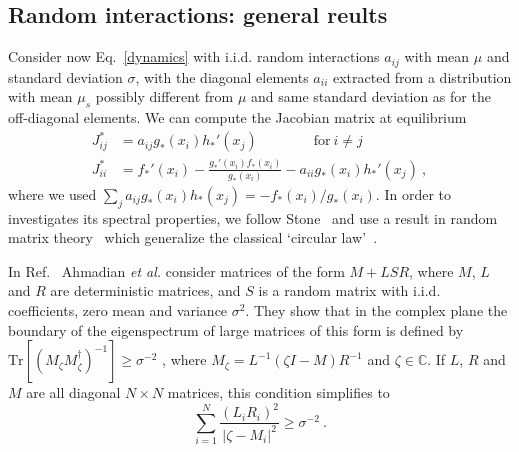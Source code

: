 \documentclass[
 reprint,
 amsmath,amssymb,
 aps,
]{revtex4-2}
\begin{document}
\subsection{Random interactions: general reults}

Consider now Eq.~\eqref{dynamics} with i.i.d. random 
interactions $a_{ij}$ with mean $\mu$ and standard 
deviation $\sigma$, with the diagonal elements $a_{ii}$ 
extracted from a distribution with mean $\mu_s$ 
possibly different from $\mu$ and same standard deviation
as for the off-diagonal elements.  
We can compute the Jacobian matrix at equilibrium
\begin{align}
    J_{ij}^* & = a_{ij}g_*(x_i)h_*'(x_j) \qquad \qquad \textrm{for} \ i\neq j \label{eq: jac off-diag}\\
    J_{ii}^* & = f_*'(x_i) - \frac{g_*'(x_i)f_*(x_i)}{g_*(x_i)} - a_{ii}g_*(x_i)h_*'(x_j) \ , \label{eq: jac diag}
\end{align}
where we used $\sum_{j}a_{ij}g_*(x_i)h_*(x_j)=-f_*(x_i)/g_*(x_i)$.
In order to investigates its spectral properties, 
we follow Stone~\cite{Stone2018} and use a
result in random matrix theory~\cite{Ahmadian2015}
which generalize the classical `circular law'~\cite{Potters2020}.

In Ref.~\cite{Ahmadian2015} Ahmadian \emph{et al.} 
consider matrices of the form $M + LSR$, where $M$,  
$L$ and $R$ are deterministic matrices, and $S$ 
is a random matrix with i.i.d. coefficients, 
zero mean and variance $\sigma^2$. They 
show that in the complex plane the boundary of the 
eigenspectrum of large matrices of this form is defined by
$\textrm{Tr}[(M_\zeta M_\zeta^\dagger)^{-1}]\geq \sigma^{-2}$ , 
where $M_\zeta = L^{-1}(\zeta I - M)R^{-1}$ and $\zeta\in\mathbb{C}$. 
If $L$, $R$ and $M$ are all diagonal $N\times N$ matrices, 
this condition simplifies to
\begin{equation}
    \sum_{i=1}^N\frac{(L_{i}R_{i})^2}{ \vert \zeta - M_{i}\vert^2 }\geq \sigma^{-2} \ .
\label{eq: domain}
\end{equation}
\end{document}
